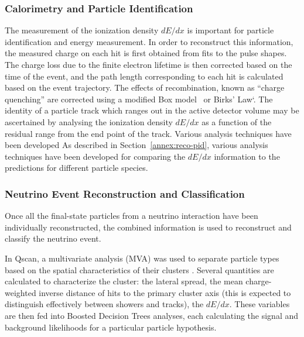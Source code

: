 \subsubsection{Calorimetry and Particle Identification}

The measurement of the ionization density $dE/dx$ is important
for particle identification and energy measurement.
In order to reconstruct this information, the measured charge on each hit 
is first obtained from fits to the pulse shapes.
The charge loss due to the finite electron lifetime is then corrected
based on the time of the event, and the path length corresponding
to each hit is calculated based on the event trajectory.
The effects of recombination, known as ``charge quenching''
are corrected using a modified Box model~\cite{Thomas:1987zz} 
or Birks' Law`\cite{Birks:1964zz}.
The identity of a particle track which ranges out in the active detector volume
may be ascertained by analysing the ionization density $dE/dx$ as a function of 
the residual range from the end point of the track.
Various analysis techniques have been developed
As described in Section~\ref{annex:reco-pid}, various analysis techniques
have been developed for comparing the $dE/dx$ information to the predictions
for different particle species.
 

\subsubsection{Neutrino Event Reconstruction and Classification}

Once all the final-state particles from a neutrino interaction have been 
individually reconstructed, the combined information is used to 
reconstruct and classify the neutrino event.

In Qscan, a multivariate analysis (MVA) was used to separate particle types based on the spatial characteristics of their clusters
\cite{WA105_TDR,LAGUNA-LBNO-deliv,LAGUNA-LBNO-EOI}.
Several quantities are calculated to 
characterize the cluster: the lateral spread, the mean charge-weighted inverse distance of hits to the primary cluster axis
(this is expected to distinguish effectively between showers and tracks), the $dE/dx$.
These variables are then fed into Boosted Decision Trees analyses, 
each calculating the signal and background likelihoods for a particular particle hypothesis.

